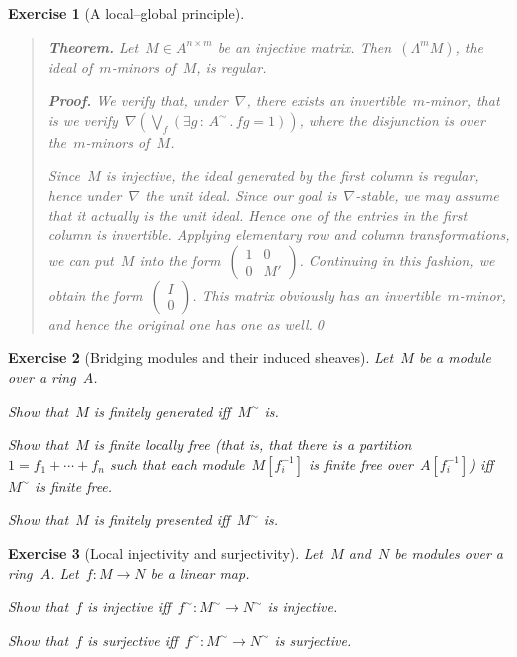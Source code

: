 \documentclass{ws-rv9x6}
\newtheorem{ex}{Exercise}
\newenvironment{exercise}[1]{
  \begin{ex}[#1]
}{\end{ex}}
\renewcommand{\_}{\mathpunct{.}}
\newcommand{\?}{\,{:}\,}
\begin{document}
\begin{exercise}{A local--global principle}
\begin{alphlist}[(f)]
\begin{quote}
\textbf{Theorem.} Let~$M \in A^{n \times m}$ be an injective matrix.
Then~$(\Lambda^m M)$, the ideal of~$m$-minors of~$M$, is regular.

\textbf{Proof.} We verify that, under~$\nabla$, there exists an
invertible~$m$-minor, that is we verify~$\nabla(\bigvee_f (\exists g\?A^\sim\_
fg=1))$, where the disjunction is over the~$m$-minors of~$M$.

Since~$M$ is injective, the ideal generated by the first column is regular,
hence under~$\nabla$ the unit ideal. Since our goal is~$\nabla$-stable, we may assume
that it actually is the unit ideal. Hence one of the entries in the first
column is invertible. Applying elementary row and column transformations, we
can put~$M$ into the
form~$\left(\begin{smallmatrix}1&0\\0&M'\end{smallmatrix}\right)$. Continuing
in this fashion, we obtain the
form~$\left(\begin{smallmatrix}I\\0\end{smallmatrix}\right)$. This matrix
obviously has an invertible~$m$-minor, and hence the original one has one as
well.\qed
\end{quote}
\end{alphlist}
\end{exercise}

\begin{exercise}{Bridging modules and their induced sheaves}%
\label{ex:bridging-modules}%
Let~$M$ be a module over a ring~$A$.
\begin{alphlist}[(c)]
\item Show that~$M$ is finitely generated iff~$M^\sim$ is.
\item\label{item:free} Show that~$M$ is finite locally free (that is, that there is a
partition~$1 = f_1 + \cdots + f_n$ such that each module~$M[f_i^{-1}]$ is
finite free over~$A[f_i^{-1}]$) iff~$M^\sim$ is finite free.
\item Show that~$M$ is finitely presented iff~$M^\sim$ is.
\end{alphlist}
\end{exercise}

\begin{exercise}{Local injectivity and surjectivity}%
Let~$M$ and~$N$ be modules over a ring~$A$. Let~$f : M \to N$ be a linear map.
\begin{alphlist}[(b)]
\item Show that~$f$ is injective iff~$f^\sim : M^\sim \to N^\sim$ is injective.
\item Show that~$f$ is surjective iff~$f^\sim : M^\sim \to N^\sim$ is surjective.
\end{alphlist}
\end{exercise}
\end{document}
